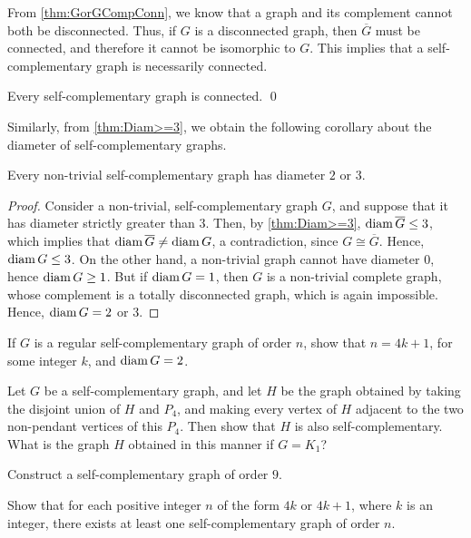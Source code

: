 From \cref{thm:GorGCompConn}, we know that a graph and its complement cannot both be disconnected. Thus, if $G$ is a disconnected graph, then $\overline G$ must be connected, and therefore it cannot be isomorphic to $G$. This implies that a self-complementary graph is necessarily connected.

\begin{Corollary}\label{cor:SCConn}
Every self-complementary graph is connected. \qed
\end{Corollary}

Similarly, from \cref{thm:Diam>=3}, we obtain the following corollary about the diameter of self-complementary graphs.

\begin{Corollary}
Every non-trivial self-complementary graph has diameter $2$ or $3$.
\end{Corollary}

\begin{proof}
Consider a non-trivial, self-complementary graph $G$, and suppose that it has diameter strictly greater than $3$. Then, by \cref{thm:Diam>=3}, $\operatorname{diam} \overline G \le 3$, which implies that $\operatorname{diam} \overline G \ne \operatorname{diam} G$, a contradiction, since $G \cong \overline G$. Hence, $\operatorname{diam} G \le 3$. On the other hand, a non-trivial graph cannot have diameter $0$, hence $\operatorname{diam} G \ge 1$. But if $\operatorname{diam} G = 1$, then $G$ is a non-trivial complete graph, whose complement is a totally disconnected graph, which is again impossible. Hence, $\operatorname{diam} G = 2$ or $3$.
\end{proof}

\begin{Exercise}
If $G$ is a regular self-complementary graph of order $n$, show that $n = 4k + 1$, for some integer $k$, and $\operatorname{diam} G = 2$.
\end{Exercise}

\begin{Exercise}
Let $G$ be a self-complementary graph, and let $H$ be the graph obtained by taking the disjoint union of $H$ and $P_4$, and making every vertex of $H$ adjacent to the two non-pendant vertices of this $P_4$. Then show that $H$ is also self-complementary. What is the graph $H$ obtained in this manner if $G = K_1$?
\end{Exercise}

\begin{Exercise}
Construct a self-complementary graph of order $9$.
\end{Exercise}

\begin{Exercise}
Show that for each positive integer $n$ of the form $4k$ or $4k + 1$, where $k$ is an integer, there exists at least one self-complementary graph of order $n$.
\end{Exercise}

